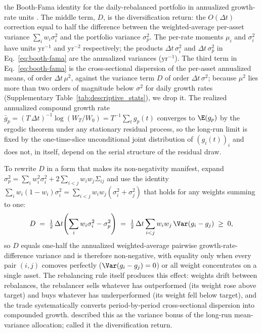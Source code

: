 the Booth-Fama identity for the daily-rebalanced portfolio in
annualized growth-rate units \cite{boothFama1992,
markowitz1976longRun}. The middle term, $D$, is the diversification
return: the $O(\Delta t)$ correction equal to half the difference
between the weighted-average per-asset variance $\sum_i w_i \sigma_i^2$
and the portfolio variance $\sigma_p^2$. The per-rate
moments $\mu_i$ and $\sigma_i^2$
have units $\mathrm{yr}^{-1}$ and $\mathrm{yr}^{-2}$ respectively;
the products $\Delta t\,\sigma_i^2$ and $\Delta t\,\sigma_p^2$ in
Eq.~\eqref{eq:booth-fama} are the annualized variances
($\mathrm{yr}^{-1}$). The
third term in Eq.~\eqref{eq:booth-fama} is the cross-sectional
dispersion of the per-asset annualized means, of order
$\Delta t\,\mu^2$, against the variance term $D$ of order
$\Delta t\,\sigma^2$; because $\mu^2$ lies more than two orders of magnitude
below $\sigma^2$ for daily growth rates
(Supplementary Table~\ref{tab:descriptive_stats}), we drop it. The realized
annualized compound
growth rate $\bar g_p = (T\,\Delta t)^{-1}\log(W_T/W_0) =
T^{-1}\sum_{t} g_p(t)$ converges to $\E(g_p)$ by the ergodic
theorem under any stationary residual process, so the long-run
limit is fixed by the one-time-slice unconditional joint
distribution of $(g_i(t))_i$ and does not, in itself, depend on
the serial structure of the residual draw.

To rewrite $D$ in a form that makes its non-negativity manifest,
expand $\sigma_p^2 = \sum_i w_i^2 \sigma_i^2 + 2 \sum_{i<j} w_i w_j
\Sigma_{ij}$ and use the identity $\sum_i w_i (1 - w_i) \sigma_i^2 =
\sum_{i<j} w_i w_j (\sigma_i^2 + \sigma_j^2)$ that holds for any
weights summing to one:
\begin{equation}
  D \;=\; \tfrac{1}{2}\,\Delta t\!\left(\sum_i w_i \sigma_i^2 - \sigma_p^2\right)
  \;=\; \tfrac{1}{2}\,\Delta t \sum_{i<j} w_i w_j \,\Var(g_i - g_j) \;\ge\; 0,
  \label{eq:dr-pairwise}
\end{equation}
so $D$ equals one-half the annualized weighted-average pairwise
growth-rate-difference variance and is therefore non-negative, with equality only when every
pair $(i,j)$ comoves perfectly ($\Var(g_i - g_j) = 0$) or all weight
concentrates on a single asset. The rebalancing rule itself produces
this effect: weights drift between rebalances, the rebalancer sells
whatever has outperformed (its weight rose above target) and buys
whatever has underperformed (its weight fell below target), and the
trade systematically converts period-by-period cross-sectional
dispersion into compounded growth. \citet{markowitz1976longRun}
described this as the variance bonus of the long-run mean-variance
allocation; \citet{boothFama1992} called it the diversification return.

